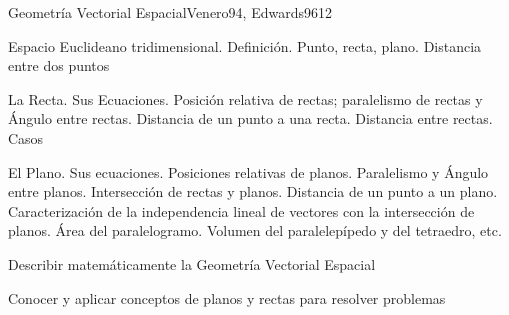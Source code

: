\begin{sumilla}
\begin{unit}{Geometr\'ia Vectorial Espacial}{Venero94, Edwards96}{12}
\begin{topicos}
      \item Espacio Euclideano tridimensional. Definici\'on. Punto, recta, plano. Distancia entre dos puntos
      \item La Recta. Sus Ecuaciones. Posici\'on relativa de rectas; paralelismo de rectas y \'Angulo entre rectas. Distancia de un punto a una recta. Distancia entre rectas. Casos
      \item El Plano. Sus ecuaciones. Posiciones relativas de planos. Paralelismo y \'Angulo entre planos. Intersecci\'on de rectas y planos. Distancia de un punto a un plano. Caracterizaci\'on de la independencia lineal de  vectores con la intersecci\'on de planos. \'Area del paralelogramo. Volumen del paralelep\'ipedo y del tetraedro, etc.
	\end{topicos}

   \begin{objetivos}
      \item Describir matem\'aticamente la Geometr\'ia Vectorial Espacial
      \item Conocer y aplicar conceptos de planos y rectas para resolver problemas
   \end{objetivos}
\end{unit}


\end{sumilla}
